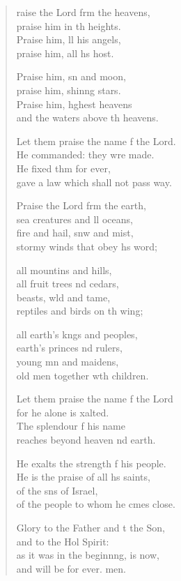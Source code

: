 \begin{verse}
  \begin{patverse}
raise the Lord frm the heavens,\Med\\
    praise him in th heights.\\
Praise him, ll his angels,\Med\\
    praise him, all h\pointup{\i}s host.

Praise him, sn and moon,\Med\\
    praise him, shin\pointup{\i}ng stars.\\
Praise him, h\pointup{\i}ghest heavens\Med\\
    and the waters above th heavens.

Let them praise the name f the Lord.\Med\\
    He commanded: they wre made.\\
He fixed thm for ever,\Med\\
    gave a law which shall not pass way.

Praise the Lord frm the earth,\Med\\
    sea creatures and ll oceans,\\
fire and hail, snw and mist,\Med\\
    stormy winds that obey h\pointup{\i}s word;

all mountins and hills,\Med\\
    all fruit trees nd cedars,\\
beasts, w\pointup{\i}ld and tame,\Med\\
    reptiles and birds on th wing;

all earth’s k\pointup{\i}ngs and peoples,\Med\\
    earth’s princes nd rulers,\\
young mn and maidens,\Med\\
    old men together w\pointup{\i}th children.

Let them praise the name f the Lord\Med\\
    for he alone is xalted.\\
The splendour f his name\Med\\
    reaches beyond heaven nd earth.

He exalts the strength f his people.\Med\\
    He is the praise of all h\pointup{\i}s saints,\\
of the sns of Israel,\Med\\
    of the people to whom he cmes close.

Glory to the Father and t the Son,\Med\\
    and to the Hol Spirit:\\
as it was in the beginn\pointup{\i}ng, is now,\Med\\
    and will be for ever. men.
  \end{patverse}
\end{verse}
